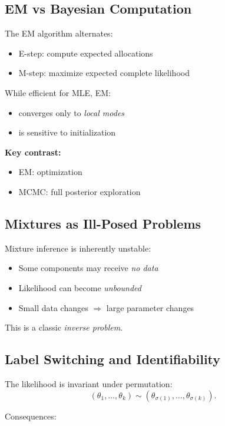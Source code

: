 \documentclass[12pt,oneside]{book}
\numberwithin{equation}{section}
\theoremstyle{definition}
\theoremstyle{plain}
\theoremstyle{remark}
\begin{document}
\subsection*{EM vs Bayesian Computation}

The EM algorithm alternates:

\begin{itemize}
\item E-step: compute expected allocations
\item M-step: maximize expected complete likelihood
\end{itemize}

While efficient for MLE, EM:
\begin{itemize}
\item converges only to \emph{local modes}
\item is sensitive to initialization
\end{itemize}

\textbf{Key contrast:}
\begin{itemize}
\item EM: optimization
\item MCMC: full posterior exploration
\end{itemize}

\subsection*{Mixtures as Ill-Posed Problems}

Mixture inference is inherently unstable:

\begin{itemize}
\item Some components may receive \emph{no data}
\item Likelihood can become \emph{unbounded}
\item Small data changes $\Rightarrow$ large parameter changes
\end{itemize}

This is a classic \emph{inverse problem}.  

\subsection*{Label Switching and Identifiability}

The likelihood is invariant under permutation:
\[
(\theta_1,\dots,\theta_k) \sim (\theta_{\sigma(1)},\dots,\theta_{\sigma(k)}).
\]

Consequences:
\end{document}
